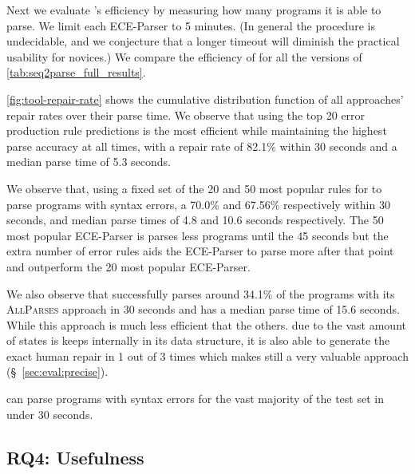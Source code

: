 
Next we evaluate \toolname's efficiency by measuring how many programs it is
able to parse. We limit each ECE-Parser to 5 minutes. (In general the procedure
is undecidable, and we conjecture that a longer timeout will diminish the
practical usability for novices.) We compare the efficiency of \toolname for all
the versions of \autoref{tab:seq2parse_full_results}.

\autoref{fig:tool-repair-rate} shows the cumulative distribution function of all
\toolname approaches' repair rates over their parse time. We observe that using
the top 20 error production rule predictions is the most efficient while
maintaining the highest parse accuracy at all times, with a repair rate of
82.1\% within 30 seconds and a median parse time of 5.3 seconds.

We observe that, using a fixed set of the 20 and 50 most popular rules for
\toolname to parse programs with syntax errors, a 70.0\% and 67.56\%
respectively within 30 seconds, and median parse times of 4.8 and 10.6 seconds
respectively. The 50 most popular ECE-Parser is parses less programs until the
45 seconds but the extra number of error rules aids the ECE-Parser to parse more
after that point and outperform the 20 most popular ECE-Parser.

We also observe that \toolname successfully parses around 34.1\% of the programs
with its \textsc{AllParses} approach in 30 seconds and has a median parse time
of 15.6 seconds. While this approach is much less efficient that the others. due
to the vast amount of states is keeps internally in its data structure, it is
also able to generate the exact human repair in 1 out of 3 times which makes
still a very valuable approach (\S~\ref{sec:eval:precise}).

\begin{framed}
  \noindent \toolname can parse programs with syntax errors for the vast
  majority of the test set in under 30 seconds.
\end{framed}

\subsection{RQ4: Usefulness}
\label{sec:eval:useful}

